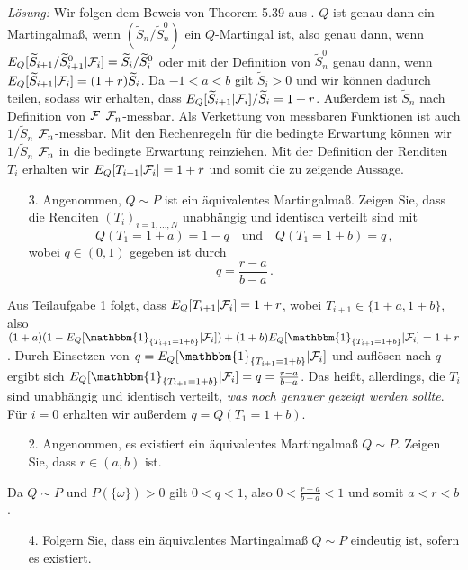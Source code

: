 \documentclass{article}
\begin{document}
\noindent\emph{Lösung: }
Wir folgen dem Beweis von Theorem 5.39 aus \cite{foellmer2016}.
$Q$ ist genau dann ein Martingalmaß, wenn $(\widetilde{S}_n/\widetilde{S}_n^0)$ ein $Q$-Martingal ist, also genau dann, wenn $E_Q[\widetilde{S}_{i+1}/\widetilde{S}^0_{i+1}|{\cal F}_i]=\widetilde{S}_i/\widetilde{S}^0_i$ oder mit der Definition von $\widetilde{S}^0_n$ genau dann, wenn $E_Q[\widetilde{S}_{i+1}|{\cal F}_i]=(1+r)\widetilde{S}_i$.
Da $-1<a<b$ gilt $\widetilde{S}_i>0$ und wir können dadurch teilen, sodass wir erhalten, dass $E_Q[\widetilde{S}_{i+1}|{\cal F}_i]/\widetilde{S}_i=1+r$.
Außerdem ist $\widetilde{S}_n$ nach Definition von ${\cal F}$ ${\cal F}_n$-messbar.
Als Verkettung von messbaren Funktionen ist auch $1/\widetilde{S}_n$ ${\cal F}_n$-messbar.
Mit den Rechenregeln für die bedingte Erwartung können wir $1/\widetilde{S}_n$ ${\cal F}_n$ in die bedingte Erwartung reinziehen.
Mit der Definition der Renditen $T_i$ erhalten wir $E_Q[T_{i+1}|{\cal F}_i]=1+r$ und somit die zu zeigende Aussage.
\begin{itemize}
\item [3.] Angenommen, $Q\sim P$ ist ein äquivalentes Martingalmaß.
  Zeigen Sie, dass die Renditen $(T_i)_{i=1,\dots,N}$ unabhängig und identisch verteilt sind mit
  \[Q(T_1=1+a)=1-q\quad\text{und}\quad Q(T_1=1+b)=q\,,\]
  wobei $q\in(0,1)$ gegeben ist durch
  \[
    q=\frac{r-a}{b-a}\,.
  \]
\end{itemize}
Aus Teilaufgabe 1 folgt, dass $E_Q[T_{i+1}|{\cal F}_i]=1+r$, wobei $T_{i+1}\in\{1+a,1+b\}$, also $(1+a)(1-E_Q[\mathbbm{1}_{\{T_{i+1}=1+b\}}|{\cal F}_i])+(1+b)E_Q[\mathbbm{1}_{\{T_{i+1}=1+b\}}|{\cal F}_i]=1+r$.
Durch Einsetzen von $q=E_Q[\mathbbm{1}_{\{T_{i+1}=1+b\}}|{\cal F}_i]$ und auflösen nach $q$ ergibt sich $E_Q[\mathbbm{1}_{\{T_{i+1}=1+b\}}|{\cal F}_i]=q=\frac{r-a}{b-a}$.
Das heißt, allerdings, die $T_i$ sind unabhängig und identisch verteilt, \emph{was noch genauer gezeigt werden sollte}.
Für $i=0$ erhalten wir außerdem $q=Q(T_1=1+b)$.
\begin{itemize}
\item[2.] Angenommen, es existiert ein äquivalentes Martingalmaß $Q\sim P$.
  Zeigen Sie, dass $r\in(a,b)$ ist.
\end{itemize}
Da $Q\sim P$ und $P(\{\omega\})>0$ gilt $0<q<1$, also $0<\frac{r-a}{b-a}<1$ und somit $a<r<b$.
\begin{itemize}
\item [4.] Folgern Sie, dass ein äquivalentes Martingalmaß $Q\sim P$ eindeutig ist, sofern es existiert.
\end{itemize}
\end{document}
